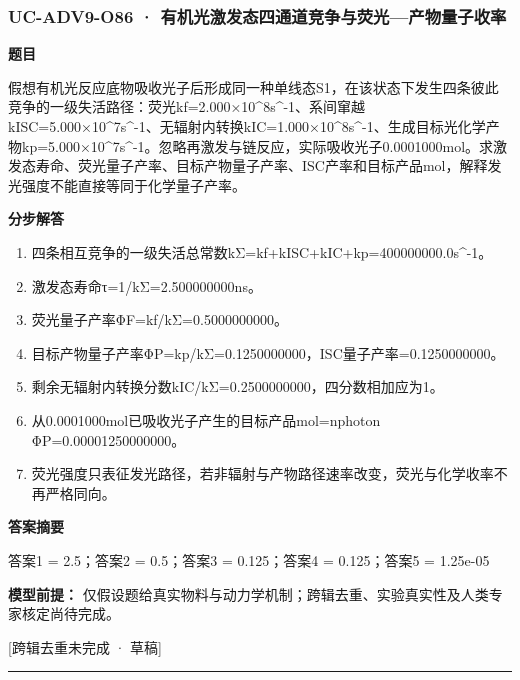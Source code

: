 \documentclass[UTF8,11pt,a4paper]{ctexart}
\begin{document}
\subsubsection*{UC-ADV9-O86 · 有机光激发态四通道竞争与荧光—产物量子收率}
\noindent\textbf{题目}\par
假想有机光反应底物吸收光子后形成同一种单线态S1，在该状态下发生四条彼此竞争的一级失活路径：荧光kf=2.000×10\textasciicircum{}8s\textasciicircum{}-1、系间窜越kISC=5.000×10\textasciicircum{}7s\textasciicircum{}-1、无辐射内转换kIC=1.000×10\textasciicircum{}8s\textasciicircum{}-1、生成目标光化学产物kp=5.000×10\textasciicircum{}7s\textasciicircum{}-1。忽略再激发与链反应，实际吸收光子0.0001000mol。求激发态寿命、荧光量子产率、目标产物量子产率、ISC产率和目标产品mol，解释发光强度不能直接等同于化学量子产率。\par
\medskip\noindent\textbf{分步解答}
\begin{enumerate}
\item 四条相互竞争的一级失活总常数kΣ=kf+kISC+kIC+kp=400000000.0s\textasciicircum{}-1。
\item 激发态寿命τ=1/kΣ=2.500000000ns。
\item 荧光量子产率ΦF=kf/kΣ=0.5000000000。
\item 目标产物量子产率ΦP=kp/kΣ=0.1250000000，ISC量子产率=0.1250000000。
\item 剩余无辐射内转换分数kIC/kΣ=0.2500000000，四分数相加应为1。
\item 从0.0001000mol已吸收光子产生的目标产品mol=nphoton ΦP=0.00001250000000。
\item 荧光强度只表征发光路径，若非辐射与产物路径速率改变，荧光与化学收率不再严格同向。
\end{enumerate}
\noindent\textbf{答案摘要}\par
答案1 = 2.5；答案2 = 0.5；答案3 = 0.125；答案4 = 0.125；答案5 = 1.25e-05\par
\noindent\textbf{模型前提：}
仅假设题给真实物料与动力学机制；跨辑去重、实验真实性及人类专家核定尚待完成。\par
\noindent\textcolor{red!65!black}{[跨辑去重未完成 · 草稿]} \par
\medskip\hrule\medskip
{}
\end{document}
